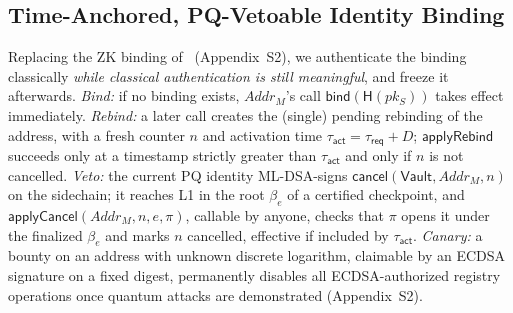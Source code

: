 \documentclass[10pt,journal,compsoc]{IEEEtran}
\theoremstyle{tplain}
\theoremstyle{tdef}
\theoremstyle{remark}
\newcommand{\supp}[1]{Appendix~#1}
\newcommand{\Vault}{\mathsf{Vault}}
\newcommand{\Hash}{\mathsf{H}}
\begin{document}
\subsection{Time-Anchored, PQ-Vetoable Identity Binding}\label{sec:binding}
Replacing the ZK binding of~\cite{myeprint} (\supp{S2}), we authenticate the binding classically \emph{while classical authentication is still meaningful}, and freeze it afterwards. \emph{Bind:} if no binding exists, $\mathit{Addr}_M$'s call $\mathsf{bind}(\Hash(pk_S))$ takes effect immediately. \emph{Rebind:} a later call creates the (single) pending rebinding of the address, with a fresh counter $n$ and activation time $\tau_{\mathsf{act}}=\tau_{\mathsf{req}}+D$; $\mathsf{applyRebind}$ succeeds only at a timestamp strictly greater than $\tau_{\mathsf{act}}$ and only if $n$ is not cancelled. \emph{Veto:} the current PQ identity ML-DSA-signs $\textsf{cancel}(\Vault,\mathit{Addr}_M,n)$ on the sidechain; it reaches L1 in the root $\beta_e$ of a certified checkpoint, and $\mathsf{applyCancel}(\mathit{Addr}_M,n,e,\pi)$, callable by anyone, checks that $\pi$ opens it under the finalized $\beta_e$ and marks $n$ cancelled, effective if included by $\tau_{\mathsf{act}}$. \emph{Canary:} a bounty on an address with unknown discrete logarithm, claimable by an ECDSA signature on a fixed digest, permanently disables all ECDSA-authorized registry operations once quantum attacks are demonstrated (\supp{S2}).
\end{document}
